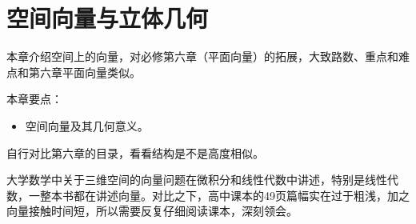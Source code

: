 \chapter{空间向量与立体几何}

本章介绍空间上的向量，对必修第六章（平面向量）的拓展，大致路数、重点和难点和第六章平面向量类似。

本章要点：
\begin{itemize}
    \item 空间向量及其几何意义。
\end{itemize}

\begin{tcolorbox}
自行对比第六章的目录，看看结构是不是高度相似。
\end{tcolorbox}

\begin{tcolorbox}
大学数学中关于三维空间的向量问题在微积分和线性代数中讲述，特别是线性代数，一整本书都在讲述向量。对比之下，高中课本的49页篇幅实在过于粗浅，加之向量接触时间短，所以需要反复仔细阅读课本，深刻领会。
\end{tcolorbox}

\newpage


\newpage


\newpage


\newpage


\newpage





